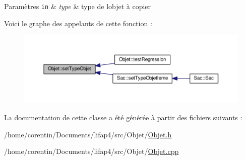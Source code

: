 \begin{DoxyParams}[1]{Paramètres}
\mbox{\tt in}  & {\em type} & type de l\textquotesingle{}objet à copier \\
\hline
\end{DoxyParams}
Voici le graphe des appelants de cette fonction \+:\nopagebreak
\begin{figure}[H]
\begin{center}
\leavevmode
\includegraphics[width=350pt]{class_objet_a2183a02ee228f3ba1e52e0e5b9904dce_icgraph}
\end{center}
\end{figure}


La documentation de cette classe a été générée à partir des fichiers suivants \+:\begin{DoxyCompactItemize}
\item 
/home/corentin/\+Documents/lifap4/src/\+Objet/\hyperlink{_objet_8h}{Objet.\+h}\item 
/home/corentin/\+Documents/lifap4/src/\+Objet/\hyperlink{_objet_8cpp}{Objet.\+cpp}\end{DoxyCompactItemize}
